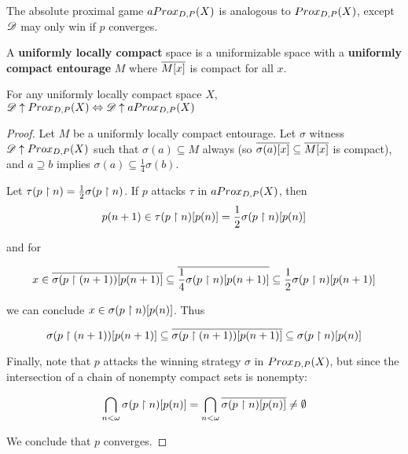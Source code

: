 \newpage

\begin{definition}
  The absolute proximal game $aProx_{D,P}(X)$ is analogous to $Prox_{D,P}(X)$, except $\mathscr{D}$ may only win if $p$ converges.
\end{definition}

\begin{definition}
  A \textbf{uniformly locally compact} space is a uniformizable space with a \textbf{uniformly compact entourage} $M$ where $\overline{M[x]}$ is compact for all $x$.
\end{definition}

\begin{theorem}
  For any uniformly locally compact space $X$,
      $\mathscr{D}\uparrow Prox_{D,P}(X) \Leftrightarrow \mathscr{D}\uparrow aProx_{D,P}(X)$
\end{theorem}

\begin{proof}
  Let $M$ be a uniformly locally compact entourage. Let $\sigma$ witness $\mathscr{D}\uparrow Prox_{D,P}(X)$ such that $\sigma(a)\subseteq M$ always (so $\overline{\sigma(a)[x]}\subseteq\overline{M[x]}$ is compact), and $a\supseteq b$  implies $\sigma(a)\subseteq\frac{1}{4}\sigma(b)$.

  Let $\tau(p\restriction n)=\frac{1}{2}\sigma(p\restriction n)$. If $p$ attacks $\tau$ in $aProx_{D,P}(X)$, then
    \[
      p(n+1)
        \in
      \tau(p\restriction n)[p(n)]
        =
      \frac{1}{2}\sigma(p\restriction n)[p(n)]
    \]

    and for

    \[
      x
        \in
      \overline{\sigma(p\restriction (n+1))[p(n+1)]}
        \subseteq
      \overline{\frac{1}{4}\sigma(p\restriction n)[p(n+1)]}
        \subseteq
      \frac{1}{2}\sigma(p\restriction n)[p(n+1)]
    \]

  we can conclude $x\in\sigma(p\restriction n)[p(n)]$. Thus

    \[
      \sigma(p\restriction (n+1))[p(n+1)]
        \subseteq
      \overline{\sigma(p\restriction (n+1))[p(n+1)]}
        \subseteq
      \sigma(p\restriction n)[p(n)]
    \]

  Finally, note that $p$ attacks the winning strategy $\sigma$ in $Prox_{D,P}(X)$, but since the intersection of a chain of nonempty compact sets is nonempty:

    \[
      \bigcap_{n<\omega} \sigma(p\restriction n)[p(n)]
        =
      \bigcap_{n<\omega} \overline{\sigma(p\restriction n)[p(n)]}
        \not=
      \emptyset
    \]

  We conclude that $p$ converges.
\end{proof}

